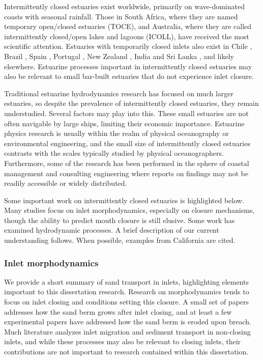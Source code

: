 Intermittently closed estuaries exist worldwide, primarily on wave-dominated coasts with seasonal rainfall. Those in South Africa, where they are named temporary open/closed estuaries (TOCE), and Australia, where they are called intermittently closed/open lakes and lagoons (ICOLL), have received the most scientific attention. Estuaries with temporarily closed inlets also exist in Chile \parencite{dussaillant_water_2009}, Brazil \parencite{suzuki_effects_1998}, Spain \parencite{moreno_morphodynamics_2010}, Portugal \parencite{fortunato_morphological_2014}, New Zealand \parencite{schallenberg_contrasting_2010}, India and Sri Lanka \parencite{ranasinghe_seasonal_2003}, and likely elsewhere. Estuarine processes important in intermittently closed estuaries may also be relevant to small bar-built estuaries that do not experience inlet closure. 

Traditional estuarine hydrodynamics research has focused on much larger estuaries, so despite the prevalence of intermittently closed estuaries, they remain understudied.  Several factors may play into this. These small estuaries are not often navigable by large ships, limiting their economic importance. Estuarine physics research is usually within the realm of physical oceanography or environmental engineering, and the small size of intermittently closed estuaries contrasts with the scales typically studied by physical oceanographers. Furthermore, some of the research has been performed in the sphere of coastal management and consulting engineering where reports on findings may not be readily accessible or widely distributed.

Some important work on intermittently closed estuaries is highlighted below. Many studies focus on inlet morphodynamics, especially on closure mechanisms, though the ability to predict mouth closure is still elusive. Some work has examined hydrodynamic processes. A brief description of our current understanding follows. When possible, examples from California are cited.

\subsubsection{Inlet morphodynamics}

We provide a short summary of sand transport in inlets, highlighting elements important to this dissertation research. Research on morphodynamics tends to focus on inlet closing and conditions setting this closure. A small set of papers addresses how the sand berm grows after inlet closing, and at least a few experimental papers have addressed how the sand berm is eroded upon breach. Much literature analyzes inlet migration and sediment transport in non-closing inlets, and while these processes may also be relevant to closing inlets, their contributions are not important to research contained within this dissertation.

